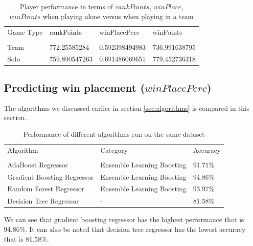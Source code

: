 \documentclass[journal,twoside,web]{ieeecolor}
\begin{document}
{\begin{table}[h]
    \caption{Player performance in terms of $rankPoints$, $winPlace$, $winPoints$ when playing alone versus when playing in a team}
    \label{tab:player_performance}
	\centering
    \begin{tabular}{l l l l}
    \toprule
    \multirow{1}{*}{Game Type} & \multirow{1}{*}{rankPoints} & \multirow{1}{*}{winPlacePerc} & \multirow{1}{*}{winPoints} \\ 
    &&& \\ \midrule
    Team & 772.25585284 & 0.592398494983 & 736.991638795 \\ \midrule
    Solo & 759.890547263 & 0.691486069651 & 779.452736318 \\
    \bottomrule
    \end{tabular}
\end{table}

\pagebreak

\subsection{Predicting win placement ($winPlacePerc$)}
The algorithms we discussed earlier in section \ref{sec:algorithms} is compared in this section.

\begin{table}[h]
    \caption{Performance of different algorithms run on the same dataset}
    \label{tab:summary}
	\centering
    \begin{tabular}{l l l}
    \toprule
    \multirow{1}{*}{Algorithm} & \multirow{1}{*}{Category} & \multirow{1}{*}{Accuracy} \\ 
    && \\ \midrule
    AdaBoost Regressor & Ensemble Learning Boosting & 91.71\% \\ \midrule
    Gradient Boosting Regressor & Ensemble Learning Boosting & 94.86\% \\ \midrule
    Random Forest Regressor & Ensemble Learning Boosting & 93.97\% \\ \midrule
    Decision Tree Regressor & - & 81.58\% \\
    \bottomrule
    \end{tabular}
\end{table}

We can see that gradient boosting regressor has the highest performance that is 94.86\%. It can also be noted that decision tree regressor has the lowest accuracy that is 81.58\%.

}
\end{document}
